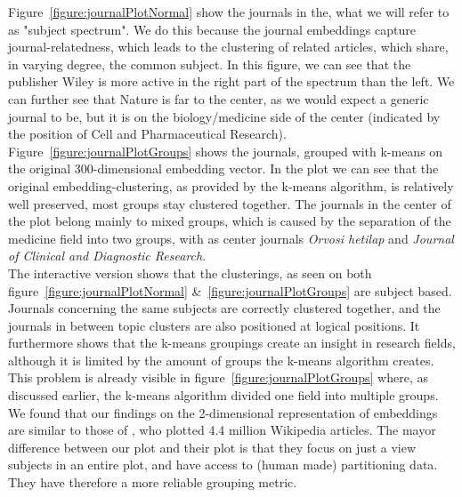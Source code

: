 \documentclass[../../Thesis.tex]{subfiles}
\begin{document}
\begin{jumpin}
Figure~\ref{figure:journalPlotNormal} show the journals in the, what we will refer to as "subject spectrum". We do this because the journal embeddings capture journal-relatedness, which leads to the clustering of related articles, which share, in varying degree, the common subject. In this figure, we can see that the publisher Wiley is more active in the right part of the spectrum than the left. We can further see that Nature is far to the center, as we would expect a generic journal to be, but it is on the biology/medicine side of the center (indicated by the position of Cell and Pharmaceutical Research).\\
Figure~\ref{figure:journalPlotGroups} shows the journals, grouped with k-means on the original 300-dimensional embedding vector. In the plot we can see that the original embedding-clustering, as provided by the k-means algorithm, is relatively well preserved, most groups stay clustered together. The journals in the center of the plot belong mainly to mixed groups, which is caused by the separation of the medicine field into two groups, with as center journals \textit{Orvosi hetilap} and \textit{Journal of Clinical and Diagnostic Research}.\\
The interactive version shows that the clusterings, as seen on both figure~\ref{figure:journalPlotNormal} \&~\ref{figure:journalPlotGroups} are subject based. Journals concerning the same subjects are correctly clustered together, and the journals in between topic clusters are also positioned at logical positions. It furthermore shows that the k-means groupings create an insight in research fields, although it is limited by the amount of groups the k-means algorithm creates. This problem is already visible in figure~\ref{figure:journalPlotGroups} where, as discussed earlier, the k-means algorithm divided one field into multiple groups. We found that our findings on the 2-dimensional representation of embeddings are similar to those of \citet{dai2015document}, who plotted 4.4 million Wikipedia articles. The mayor difference between our plot and their plot is that they focus on just a view subjects in an entire plot, and have access to (human made) partitioning data. They have therefore a more reliable grouping metric.
\end{jumpin}
\end{document}
